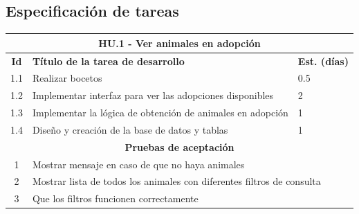 \subsection{Especificación de tareas}

\begin{table} [H]
	\centering
	\begin{tabular}{|c|p{9.5cm}|p{1cm}|}
		\hline
		\multicolumn{3}{|c|}{\textbf{HU.1 - Ver animales en adopción}} \\
		\hline
		\textbf{Id} & \textbf{Título de la tarea de desarrollo} & \textbf{Est. (días)} \\
		\hline
		1.1 & Realizar bocetos & 0.5 \\ \hline
		1.2 &  Implementar interfaz para ver las adopciones disponibles & 2 \\ \hline
		1.3 &  Implementar la lógica de obtención de animales en adopción & 1 \\ \hline
		1.4 &  Diseño y creación de la base de datos y tablas & 1 \\ \hline
		\multicolumn{3}{|c|}{\textbf{Pruebas de aceptación}} \\ \hline
		1 & \multicolumn{2}{|l|}{Mostrar mensaje en caso de que no haya animales} \\ \hline
		2 & \multicolumn{2}{|l|}{Mostrar lista de todos los animales con diferentes filtros de consulta} \\ \hline
		3 & \multicolumn{2}{|l|}{Que los filtros funcionen correctamente} \\ \hline
		
	\end{tabular}
\end{table}

